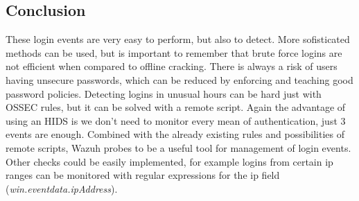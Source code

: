 \subsection{Conclusion}
These login events are very easy to perform, but also to detect.
More sofisticated methods can be used, but is important to remember that brute force logins are not efficient when compared to offline cracking.
There is always a risk of users having unsecure passwords, which can be reduced by enforcing and teaching good password policies.
\linej
Detecting logins in unusual hours can be hard just with OSSEC rules, but it can be solved with a remote script.
\linej
\linej
Again the advantage of using an HIDS is we don't need to monitor every mean of authentication, just 3 events are enough. Combined with the already existing rules and possibilities of remote scripts, Wazuh probes to be a useful tool for management of login events. Other checks could be easily implemented, for example logins from certain ip ranges can be monitored with regular expressions for the ip field (\textit{win.eventdata.ipAddress}).

